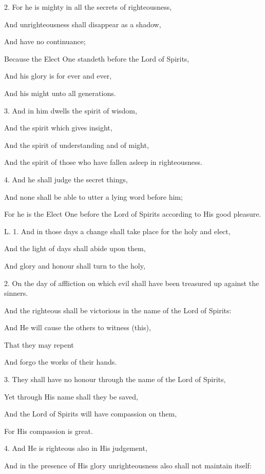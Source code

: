 2. For he is mighty in all the secrets of righteousness,

And unrighteousness shall disappear as a shadow,

And have no continuance;

Because the Elect One standeth before the Lord of Spirits,

And his glory is for ever and ever,

And his might unto all generations.

3. And in him dwells the spirit of wisdom,

And the spirit which gives insight,

And the spirit of understanding and of might,

And the spirit of those who have fallen asleep in righteousness.

4. And he shall judge the secret things,

And none shall be able to utter a lying word before him;

For he is the Elect One before the Lord of Spirits according to His good pleasure.


L. 1. And in those days a change shall take place for the holy and elect,

And the light of days shall abide upon them,

And glory and honour shall turn to the holy,

2. On the day of affliction on which evil shall have been treasured up against the sinners.

And the righteous shall be victorious in the name of the Lord of Spirits:

And He will cause the others to witness (this),

That they may repent

And forgo the works of their hands.

3. They shall have no honour through the name of the Lord of Spirits,

Yet through His name shall they be saved,

And the Lord of Spirits will have compassion on them,

For His compassion is great.

4. And He is righteous also in His judgement,

And in the presence of His glory unrighteousness also shall not maintain itself:

